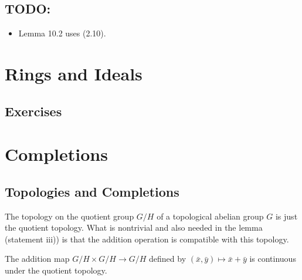 \documentclass{note}
\begin{document}
\section*{TODO:}

\begin{itemize}
  \item Lemma 10.2 uses (2.10).
\end{itemize}

\chapter{Rings and Ideals}

\section*{Exercises}
\setcounter{chapter}{9}

\chapter{Completions}

\section*{Topologies and Completions}

The topology on the quotient group $G/H$ of a topological abelian group $G$ is
just the quotient topology. What is nontrivial and also needed in the lemma
(statement iii)) is that the addition operation is compatible with this
topology.

\begin{lemma*}
  The addition map $G/H \times G/H \to G/H$ defined by $(\bar{x},\bar{y}) \mapsto
    \bar{x}+\bar{y}$ is continuous under the quotient topology.
\end{lemma*}
\end{document}
